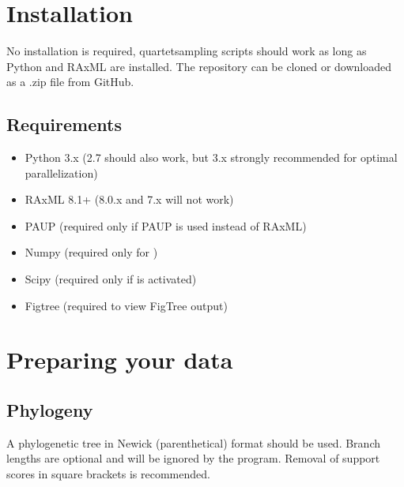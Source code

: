 \documentclass[letterpaper,12pt,english]{sphinxmanual}
\begin{document}
\section{Installation}
\label{\detokenize{intro:installation}}
No installation is required, quartetsampling scripts should work as long as Python and RAxML are installed.  The repository can be cloned or downloaded as a .zip file from GitHub.


\subsection{Requirements}
\label{\detokenize{intro:requirements}}\begin{itemize}
\item {} 
Python 3.x (2.7 should also work, but 3.x strongly recommended for optimal parallelization) 

\item {} 
RAxML 8.1+ (8.0.x and 7.x will not work) 

\end{itemize}

\begin{itemize}
\item {} 
PAUP   (required only if PAUP is used instead of RAxML)

\item {} 
Numpy  (required only for )

\item {} 
Scipy  (required only if  is activated)

\item {} 
Figtree  (required to view FigTree output)

\end{itemize}


\section{Preparing your data}
\label{\detokenize{intro:preparing-your-data}}

\subsection{Phylogeny}
\label{\detokenize{intro:phylogeny}}
A phylogenetic tree in Newick (parenthetical) format should be used.  Branch lengths are optional and will be ignored by the program.  Removal of support scores in square brackets is recommended.
\end{document}
